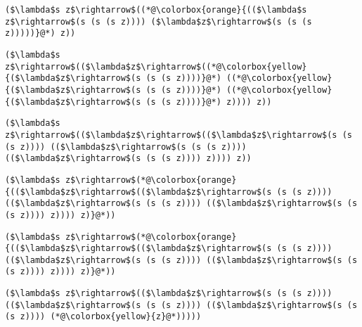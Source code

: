 \documentclass{beamer}
\begin{document}
\begin{frame}[fragile]{\CurrentSection}
\lstset{basicstyle=\ttfamily\small}\lstset{numbers=none}\lstset{language=ML}\begin{lstlisting}
($\lambda$s z$\rightarrow$((*@\colorbox{orange}{(($\lambda$s z$\rightarrow$(s (s (s z)))) ($\lambda$z$\rightarrow$(s (s (s z)))))}@*) z))
\end{lstlisting}
\pause\lstset{language=ML}\begin{lstlisting}
($\lambda$s z$\rightarrow$(($\lambda$z$\rightarrow$((*@\colorbox{yellow}{($\lambda$z$\rightarrow$(s (s (s z))))}@*) ((*@\colorbox{yellow}{($\lambda$z$\rightarrow$(s (s (s z))))}@*) ((*@\colorbox{yellow}{($\lambda$z$\rightarrow$(s (s (s z))))}@*) z)))) z))
\end{lstlisting}

\end{frame}

\begin{frame}[fragile]{\CurrentSection}
\lstset{basicstyle=\ttfamily\small}\lstset{numbers=none}\lstset{language=ML}\begin{lstlisting}
($\lambda$s z$\rightarrow$(($\lambda$z$\rightarrow$(($\lambda$z$\rightarrow$(s (s (s z)))) (($\lambda$z$\rightarrow$(s (s (s z)))) (($\lambda$z$\rightarrow$(s (s (s z)))) z)))) z))
\end{lstlisting}
\pause\lstset{language=ML}\begin{lstlisting}
($\lambda$s z$\rightarrow$(*@\colorbox{orange}{(($\lambda$z$\rightarrow$(($\lambda$z$\rightarrow$(s (s (s z)))) (($\lambda$z$\rightarrow$(s (s (s z)))) (($\lambda$z$\rightarrow$(s (s (s z)))) z)))) z)}@*))
\end{lstlisting}

\end{frame}

\begin{frame}[fragile]{\CurrentSection}
\lstset{basicstyle=\ttfamily\small}\lstset{numbers=none}\lstset{language=ML}\begin{lstlisting}
($\lambda$s z$\rightarrow$(*@\colorbox{orange}{(($\lambda$z$\rightarrow$(($\lambda$z$\rightarrow$(s (s (s z)))) (($\lambda$z$\rightarrow$(s (s (s z)))) (($\lambda$z$\rightarrow$(s (s (s z)))) z)))) z)}@*))
\end{lstlisting}
\pause\lstset{language=ML}\begin{lstlisting}
($\lambda$s z$\rightarrow$(($\lambda$z$\rightarrow$(s (s (s z)))) (($\lambda$z$\rightarrow$(s (s (s z)))) (($\lambda$z$\rightarrow$(s (s (s z)))) (*@\colorbox{yellow}{z}@*)))))
\end{lstlisting}

\end{frame}
\end{document}
